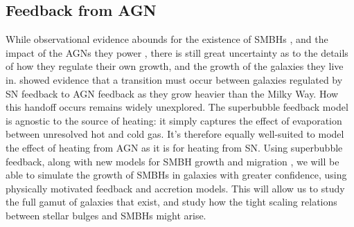 \subsection{Feedback from AGN}
While observational evidence abounds for the existence of SMBHs
\citep{Kormendy2013}, and the impact of the AGNs they power
\citep{Veilleux2005}, there is still great uncertainty as to the details of how
they regulate their own growth, and the growth of the galaxies they live in.
\citet{Keller2016a} showed evidence that a transition must occur between
galaxies regulated by SN feedback to AGN feedback as they grow heavier than the
Milky Way.  How this handoff occurs remains widely unexplored.  The superbubble
feedback model is agnostic to the source of heating: it simply captures the
effect of evaporation between unresolved hot and cold gas.  It's therefore
equally well-suited to model the effect of heating from AGN as it is for heating
from SN.  Using superbubble feedback, along with new models for SMBH growth
\citep{Hopkins2010} and migration \citep{Tremmel2015}, we will be able to
simulate the growth of SMBHs in galaxies with greater confidence, using
physically motivated feedback and accretion models.  This will allow us to study
the full gamut of galaxies that exist, and study how the tight scaling relations
between stellar bulges and SMBHs might arise.

